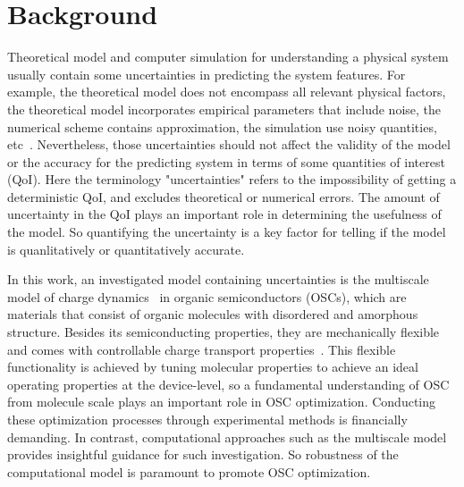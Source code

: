 \documentclass[%
 reprint,
 amsmath,amssymb,
 aps,
]{revtex4-2}
\begin{document}
\maketitle


\section{Background}

Theoretical model and computer simulation for understanding a physical system usually contain some uncertainties in predicting the system features. 
For example, the theoretical model does not encompass all relevant physical factors, the theoretical model incorporates empirical parameters that include noise, the numerical scheme contains approximation, the simulation use noisy quantities, etc~\cite{sarkar_uncertainty_2017,oconnor_quantifying_2024, chernatynskiy_uncertainty_2013, suleimenova_tutorial_2021,coveney_reliability_2021, coveney_when_2021}.
Nevertheless, those uncertainties should not affect the validity of the model or the accuracy for the predicting system in terms of some quantities of interest (QoI). 
Here the terminology "uncertainties" refers to the impossibility of getting a deterministic QoI, and excludes theoretical or numerical errors. 
The amount of uncertainty in the QoI plays an important role in determining the usefulness of the model. 
So quantifying the uncertainty is a key factor for telling if the model is quanlitatively or quantitatively accurate. 

In this work, an investigated model containing uncertainties is the multiscale model of charge dynamics~\cite{Baumeier2011, edeling_global_2024,coropceanu_charge_2007} in organic semiconductors (OSCs), which are materials that consist of organic molecules with disordered and amorphous structure. Besides its semiconducting properties, they are mechanically flexible and comes with controllable charge transport properties~\cite{hamers_flexible_2001,liu_high_2015,chow_organic_2020}. 
This flexible functionality is achieved by tuning molecular properties to achieve an ideal operating properties at the device-level\cite{bronstein_role_2020, bredas_organic_2002}, so a fundamental understanding of OSC from molecule scale  plays an important role in OSC optimization.
Conducting these optimization processes through experimental methods is financially demanding. In contrast, computational approaches such as the multiscale model provides insightful guidance for such investigation. So robustness of the computational model is paramount to promote OSC optimization.
\end{document}
